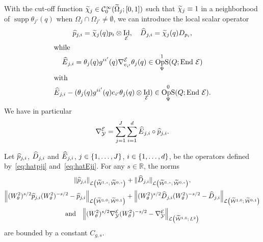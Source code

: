 \documentclass[10pt]{amsart}
\theoremstyle{definition}\newtheorem{defi}[theo]{Definition}\newtheorem{rema}[theo]{Remark}\newtheorem{exam}[theo]{Example}\newtheorem{exem}[theo]{Example}\newtheorem{nota}[theo]{Notation}
\newcommand{\R}{\mathbb{R}}
\newcommand{\clW}{\mathcal{W}}
\newcommand{\clC}{\mathcal{C}}
\newcommand{\clY}{\mathcal{Y}}
\newcommand{\clE}{\mathcal{E}}
\newcommand{\clL}{\mathcal{L}}
\DeclareMathOperator{\End}{End}
\DeclareMathOperator{\OpS}{OpS}
\DeclareMathOperator{\suppp}{supp}
\DeclareMathOperator{\Idd}{Id}
\let\oldtilde\tilde
\renewcommand*{\tilde}[1]{\mathchoice{\widetilde{#1}}{\widetilde{#1}}{\oldtilde{#1}}{\oldtilde{#1}}}
\let\oldhat\hat
\renewcommand*{\hat}[1]{\mathchoice{\widehat{#1}}{\widehat{#1}}{\oldhat{#1}}{\oldhat{#1}}}
\let\originalleft\left
\let\originalright\right
\renewcommand{\left}{\mathopen{}\mathclose\bgroup\originalleft}
\renewcommand{\right}{\aftergroup\egroup\originalright}
\begin{document}
With the cut-off function $\tilde{\chi}_{j}\in \clC^{\infty}_{0}(\tilde{\Omega}_{j};[0,1])$ such that $\tilde{\chi}_{j}\equiv 1$ in a neighborhood of $\suppp\theta_{j'}(q)$ when $\Omega_{j}\cap \Omega_{j'}\neq \emptyset$, we can introduce the local scalar operator
\begin{gather}
\hat{p}_{j,i}=\tilde{\chi}_{j}(q)p_{i}\otimes \Idd_{\clE},\quad \hat{D}_{j,i}=\tilde{\chi}_{j}(q)D_{p_{i}},\label{eq:hatpji}
\\
\intertext{while} \hat{E}_{j,i}=\theta_{j}(q)g^{ii'}(q)\nabla_{e_{i'}}^{\clE}\theta_{j}(q)\in \OpS^{1}_{\Psi}(Q;\End\,\clE)\label{eq:hatEji}\\
\intertext{with}
\hat{E}_{j,i}-(\theta_{j}(q)g^{ii'}(q)e_{i'}\theta_{j}(q)\otimes \Idd_{\clE})\in \OpS^{0}_{\Psi}(Q;\End\,\clE).\label{eq:hatEji12}
\end{gather}
We have in particular
\[
\nabla^{\clE}_{\clY}=\sum_{j=1}^{J}\sum_{i=1}^{d}\hat{E}_{j,i}\circ \hat{p}_{j,i}.
\]
\begin{prop}\label{pr:nablaY}
Let $\hat{p}_{j,i}$, $\hat{D}_{j,i}$ and $\hat{E}_{j,i}$, $j\in \left\{1,\dots,J\right\}$, $i\in \left\{1,\dots,d\right\}$, be the operators defined by~\eqref{eq:hatpji} and~\eqref{eq:hatEji}. For any $s\in \R$, the norms
\begin{multline*}
\|\hat{p}_{j,i}\|_{\clL\left(\widetilde{\clW}^{1,s};\,\widetilde{\clW}^{0,s}\right)}+\|\hat{D}_{j,i}\|_{\clL\left(\widetilde{\clW}^{1,s};\,\widetilde{\clW}^{0,s}\right)},
\\
\left\|(W^{2}_{\theta})^{s/2}\hat{p}_{j,i}(W^{2}_{\theta})^{-s/2}-\hat{p}_{j,i}\right\|_{\clL\left(\widetilde{\clW}^{1,0};\,\widetilde{\clW}^{0,1}\right)}+\left\|(W^{2}_{\theta})^{s/2}\hat{D}_{j,i}(W^{2}_{\theta})^{-s/2}-\hat{D}_{j,i}\right\|_{\clL\left(\widetilde{\clW}^{1,0};\,\widetilde{\clW}^{0,1}\right)}
\\
\text{and}\quad
\left\|(W^{2}_{\theta})^{s/2}\nabla_{\clY}^{\clE}(W^{2}_{\theta})^{-s/2}-\nabla_{\clY}^{\clE}\right\|_{\clL\left(\widetilde{\clW}^{1,0};\,L^{2}\right)}
\end{multline*}
are bounded by a constant $C_{g,s}$.
\end{prop}
\end{document}
